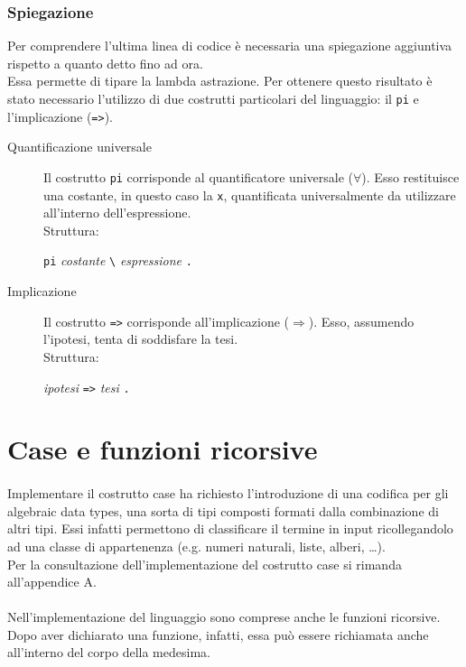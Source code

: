 \documentclass[12pt,a4paper,openright,twoside]{report}
\begin{document}
\subsubsection{Spiegazione}
Per comprendere l'ultima linea di codice è necessaria una spiegazione aggiuntiva rispetto a quanto detto fino ad ora.\\
Essa permette di tipare la lambda astrazione. Per ottenere questo risultato è stato necessario l'utilizzo di due costrutti particolari del linguaggio: il \verb"pi" e l'implicazione (\verb"=>").\\
\begin{description}
 \item[Quantificazione universale] Il costrutto \verb"pi" corrisponde al quantificatore universale ($\forall$). Esso restituisce una costante, in questo caso la \verb"x", quantificata universalmente da utilizzare all'interno dell'espressione.\\
 Struttura:
 \begin{center}
  \verb"pi" \textit{costante} \verb"\" \textit{espressione} \verb"."
 \end{center}
 \item[Implicazione] Il costrutto \verb"=>" corrisponde all'implicazione ($\Rightarrow$). Esso, assumendo l'ipotesi, tenta di soddisfare la tesi.\\
 Struttura:
 \begin{center}
  \textit{ipotesi} \verb"=>" \textit{tesi} \verb"."
 \end{center}
\end{description}

\section{Case e funzioni ricorsive}

\paragraph{}
Implementare il costrutto case ha richiesto l'introduzione di una codifica per gli algebraic data types, una sorta di tipi composti formati dalla combinazione di altri tipi. Essi infatti permettono di classificare il termine in input ricollegandolo ad una classe di appartenenza (e.g. numeri naturali, liste, alberi, \ldots).\\
Per la consultazione dell'implementazione del costrutto case si rimanda all'appendice A.

\paragraph{}
Nell'implementazione del linguaggio sono comprese anche le funzioni ricorsive. Dopo aver dichiarato una funzione, infatti, essa può essere richiamata anche all'interno del corpo della medesima.
\end{document}
